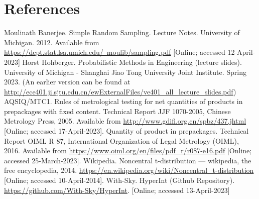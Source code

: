 \documentclass[12pt]{article}
\begin{document}
\section{References}
\begingroup  %
\renewcommand{\section}[2]{} 
\begin{thebibliography}{99}
     Moulinath Banerjee. Simple Random Sampling. Lecture Notes. University of Michigan. 2012. Available from \href{https://dept.stat.lsa.umich.edu/~moulib/sampling.pdf}{https://dept.stat.lsa.umich.edu/~moulib/sampling.pdf} [Online; accessed 12-April-2023]
     Horst Hohberger. Probabilistic Methods in Engineering (lecture slides). University of Michigan - Shanghai Jiao Tong University Joint Institute. Spring 2023. (An earlier version can be found at \href{http://ece401.ji.sjtu.edu.cn/ewExternalFiles/ve401\_all\_lecture\_slides.pdf}{http://ece401.ji.sjtu.edu.cn/ewExternalFiles/ve401\_all\_lecture\_slides.pdf})
     AQSIQ/MTC1. Rules of metrological testing for net quantities of products in prepackages with fixed content. Technical Report JJF 1070-2005, Chinese Metrology Press, 2005. Available from \href{http://www.gdifi.org.cn/spbz/437.jhtml}{http://www.gdifi.org.cn/spbz/437.jhtml} [Online; accessed 17-April-2023].
	 Quantity of product in prepackages. Technical Report OIML R 87, International Organization of Legal Metrology (OIML), 2016. Available from \href{https://www.oiml.org/en/files/pdf\_r/r087-e16.pdf}{https://www.oiml.org/en/files/pdf\_r/r087-e16.pdf} [Online; accessed 25-March-2023].
     Wikipedia. Noncentral t-distribution — wikipedia, the free encyclopedia, 2014. \href{https://en.wikipedia.org/wiki/Noncentral\_t-distribution}{https://en.wikipedia.org/wiki/Noncentral\_t-distribution} [Online; accessed 10-April-2014].
     With-Sky. HyperInt (Github Repository). \href{https://github.com/With-Sky/HyperInt}{https://github.com/With-Sky/HyperInt}. [Online; accessed 13-April-2023]
    \end{thebibliography}
    \endgroup
\end{document}
